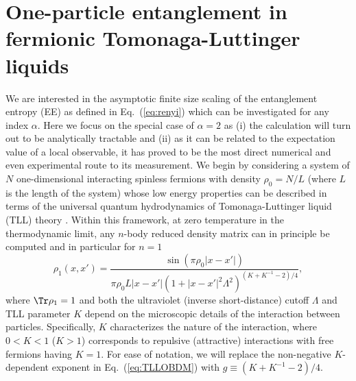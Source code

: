 \section{One-particle entanglement in fermionic Tomonaga-Luttinger liquids}
We are interested in the asymptotic finite size scaling of the entanglement
entropy (EE) as defined in Eq.~(\ref{eq:renyi}) which can be investigated for
any \ren index $\alpha$.  Here we focus on the special case of $\alpha=2$ as
(i) the calculation will turn out to be analytically tractable and
(ii) as it can be related to the expectation value of a local observable, it
has proved to be the most direct numerical
\cite{Hastings:2010dc,Grover:2013cs,McMinis:2013dp,Drut:2015fs} and even experimental
\cite{Islam:2015cm,Melko:2016bo} route to its measurement. We begin by considering a system
of $N$ one-dimensional interacting spinless fermions with density $\rho_0=N/L$ (where $L$
is the length of the system) whose low energy properties can be described in
terms of the universal quantum hydrodynamics of 
Tomonaga-Luttinger liquid (TLL) theory \cite{Tomonaga1951, Haldane1981}.
Within this framework, at zero temperature in the thermodynamic limit, any
$n$-body reduced density matrix can in principle be computed
\cite{giamarchi:2004qu} and in particular for $n=1$ \cite{Dzyaloshinskii:1974un}
%
\begin{equation}
\rho_1\left(x,x'\right)=\frac{\sin(\pi \rho_0|x-x'|)}{\pi
\rho_0L|x-x'|(1+|x-x'|^2\Lambda^2)^{(K+K^{-1}-2)/4}},
\label{eq:TLLOBDM}
\end{equation}
%
where $\Tr \rho_1 = 1$ and both the ultraviolet (inverse short-distance) cutoff
$\Lambda$ and TLL parameter $K$ depend on the microscopic details of the
interaction between particles. Specifically, $K$ characterizes the nature of
the interaction, where $0<K<1$ ($K>1$) corresponds to repulsive (attractive)
interactions with free fermions having $K=1$.  For ease of notation, we will
replace the non-negative $K$-dependent exponent in Eq.~(\ref{eq:TLLOBDM}) with
$g\equiv(K+K^{-1}-2)/4$.  

